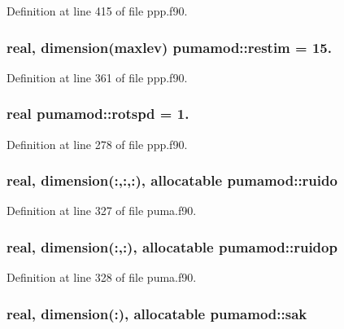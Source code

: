 \-Definition at line 415 of file ppp.\-f90.

\hypertarget{classpumamod_a89c938c5067b7da4825d70342cc62fc5}{
\subsubsection[{restim}]{\setlength{\rightskip}{0pt plus 5cm}real, dimension(maxlev) {\bf pumamod\-::restim} = 15.}}
\label{classpumamod_a89c938c5067b7da4825d70342cc62fc5}


\-Definition at line 361 of file ppp.\-f90.

\hypertarget{classpumamod_a80df9669ec5bab4a057cae01f5c1a2e6}{
\subsubsection[{rotspd}]{\setlength{\rightskip}{0pt plus 5cm}real {\bf pumamod\-::rotspd} = 1.}}
\label{classpumamod_a80df9669ec5bab4a057cae01f5c1a2e6}


\-Definition at line 278 of file ppp.\-f90.

\hypertarget{classpumamod_a631f8bc1450b1c083f26a35cab8d87cc}{
\subsubsection[{ruido}]{\setlength{\rightskip}{0pt plus 5cm}real, dimension(\-:,\-:,\-:), allocatable {\bf pumamod\-::ruido}}}
\label{classpumamod_a631f8bc1450b1c083f26a35cab8d87cc}


\-Definition at line 327 of file puma.\-f90.

\hypertarget{classpumamod_a839f7aa31c37072113405a43e334292e}{
\subsubsection[{ruidop}]{\setlength{\rightskip}{0pt plus 5cm}real, dimension(\-:,\-:), allocatable {\bf pumamod\-::ruidop}}}
\label{classpumamod_a839f7aa31c37072113405a43e334292e}


\-Definition at line 328 of file puma.\-f90.

\hypertarget{classpumamod_ae752a8854b0014c33704f7390b78687d}{
\subsubsection[{sak}]{\setlength{\rightskip}{0pt plus 5cm}real, dimension(\-:), allocatable {\bf pumamod\-::sak}}}
\label{classpumamod_ae752a8854b0014c33704f7390b78687d}


